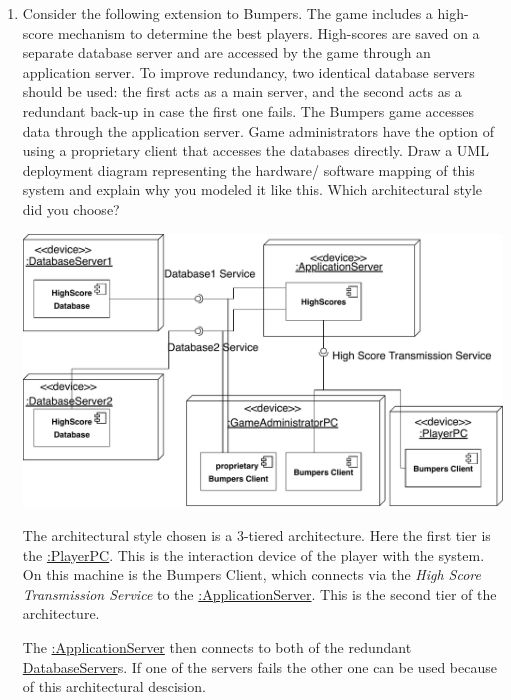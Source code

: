\documentclass[a4paper, 10pt]{article}
\begin{document}
\begin{enumerate}
    \item
    Consider the following extension to Bumpers. 
    The game includes a high- score mechanism to determine the best players. 
    High-scores are saved on a separate database server and are accessed by the game through an 
    application server. To improve redundancy, two identical database servers should be used: 
    the first acts as a main server, and the second acts as a redundant back-up in case the 
    first one fails. The Bumpers game accesses data through the application server. 
    Game administrators have the option of using a proprietary client that accesses the databases 
    directly. Draw a UML deployment diagram representing the hardware/ software mapping of this 
    system and explain why you modeled it like this. Which architectural style did you choose?
    \vspace{0.5cm}


    \includegraphics[width=\linewidth]{task3.pdf}


    The architectural style chosen is a 3-tiered architecture.
    Here the first tier is the \underline{:PlayerPC}. This is the interaction device of the player with the system.
    On this machine is the Bumpers Client, which connects via the \textit{High Score Transmission Service} to the
    \underline{:ApplicationServer}. This is the second tier of the architecture.

    The \underline{:ApplicationServer} then connects to both of the redundant \underline{DatabaseServer}s. 
    If one of the servers fails the other one can be used because of this architectural descision.


\end{enumerate}
\end{document}
